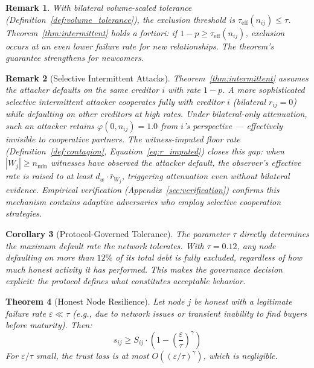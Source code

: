\documentclass[11pt]{article}
\newtheorem{theorem}{Theorem}[section]
\newtheorem{corollary}[theorem]{Corollary}
\newtheorem{remark}[theorem]{Remark}
\begin{document}
\begin{remark}
With bilateral volume-scaled tolerance (Definition~\ref{def:volume_tolerance}), the exclusion threshold is $\tau_{\text{eff}}(n_{ij}) \leq \tau$. Theorem~\ref{thm:intermittent} holds \emph{a fortiori}: if $1 - p \geq \tau_{\text{eff}}(n_{ij})$, exclusion occurs at an even lower failure rate for new relationships. The theorem's guarantee strengthens for newcomers.
\end{remark}

\begin{remark}[Selective Intermittent Attacks]
Theorem~\ref{thm:intermittent} assumes the attacker defaults on \emph{the same creditor} $i$ with rate $1-p$. A more sophisticated \emph{selective intermittent attacker} cooperates fully with creditor $i$ (bilateral $r_{ij} = 0$) while defaulting on other creditors at high rates. Under bilateral-only attenuation, such an attacker retains $\varphi(0, n_{ij}) = 1.0$ from $i$'s perspective --- effectively invisible to cooperative partners. The witness-imputed floor rate (Definition~\ref{def:contagion}, Equation~\ref{eq:r_imputed}) closes this gap: when $|W_j| \geq n_{\min}$ witnesses have observed the attacker default, the observer's effective rate is raised to at least $d_w \cdot \bar{r}_{W_j}$, triggering attenuation even without bilateral evidence. Empirical verification (Appendix~\ref{sec:verification}) confirms this mechanism contains adaptive adversaries who employ selective cooperation strategies.
\end{remark}

\begin{corollary}[Protocol-Governed Tolerance]
The parameter $\tau$ directly determines the maximum default rate the network tolerates. With $\tau = 0.12$, any node defaulting on more than $12\%$ of its total debt is fully excluded, regardless of how much honest activity it has performed. This makes the governance decision explicit: the protocol defines what constitutes acceptable behavior.
\end{corollary}

\begin{theorem}[Honest Node Resilience]\label{thm:honest_resilience}
Let node $j$ be honest with a legitimate failure rate $\varepsilon \ll \tau$ (e.g., due to network issues or transient inability to find buyers before maturity). Then:
\begin{equation}
    s_{ij} \geq S_{ij} \cdot \left(1 - \left(\frac{\varepsilon}{\tau}\right)^{\!\gamma}\right)
\end{equation}
For $\varepsilon / \tau$ small, the trust loss is at most $O((\varepsilon/\tau)^\gamma)$, which is negligible.
\end{theorem}
\end{document}
